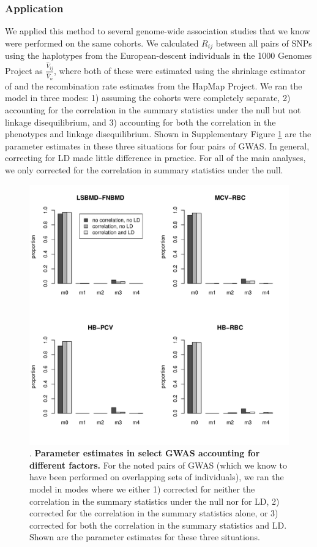 \documentclass[11pt,titlepage]{article}
\begin{document}
\subsubsection{Application}
We applied this method to several genome-wide association studies that we know were performed on the same cohorts. We calculated $R_{ij}$ between all pairs of SNPs using the haplotypes from the European-descent individuals in the 1000 Genomes Project as $\frac{\hat V_{ij}}{\hat V_{ii}}$, where both of these were estimated using the shrinkage estimator of \citet{Wen:2010aa} and the recombination rate estimates from the HapMap Project. We ran the model in three modes: 1) assuming the cohorts were completely separate, 2) accounting for the correlation in the summary statistics under the null but not linkage disequilibrium, and 3) accounting for both the correlation in the phenotypes and linkage disequilibrium. Shown in Supplementary Figure \ref{f_barplot} are the parameter estimates in these three situations for four pairs of GWAS. In general, correcting for LD made little difference in practice. For all of the main analyses, we only corrected for the correlation in summary statistics under the null.


\begin{figure}
\begin{center}
\includegraphics[scale = 0.6]{figs/barplot.pdf}
\caption{. \textbf{Parameter estimates in select GWAS accounting for different factors.} For the noted pairs of GWAS (which we know to have been performed on overlapping sets of individuals), we ran the model in modes where we either 1) corrected for neither the correlation in the summary statistics under the null nor for LD, 2) corrected for the correlation in the summary statistics alone, or 3) corrected for both the correlation in the summary statistics and LD. Shown are the parameter estimates for these three situations.}\label{f_barplot}
\end{center}
\end{figure}
\end{document}

